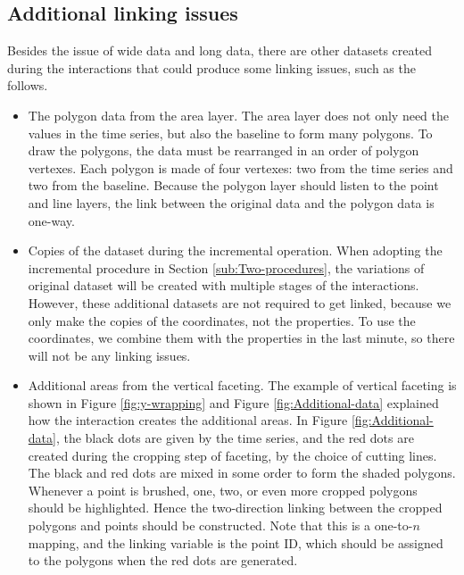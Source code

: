 \documentclass[12pt]{article}
\begin{document}
\subsection{Additional linking issues\label{sub:Linking-of-the-addition}}

Besides the issue of wide data and long data, there are other datasets
created during the interactions that could produce some linking issues,
such as the follows.
\begin{itemize} \itemsep 0in
\item The polygon data from the area layer.
The area layer does not
only need the values in the time series, but also the baseline to
form many polygons. To draw the polygons, the data must be rearranged
in an order of polygon vertexes. Each polygon is made of four vertexes:
two from the time series and two from the baseline. Because the polygon
layer should listen to the point and line layers, the link between
the original data and the polygon data is one-way.

\item Copies of the dataset during the incremental operation.
When adopting the incremental procedure in Section
\ref{sub:Two-procedures}, the variations of original dataset will
be created with multiple stages of the interactions. However, these
additional datasets are not required to get linked, because we only
make the copies of the coordinates, not the properties. To use the
coordinates, we combine them with the properties in the last minute,
so there will not be any linking issues.

\item Additional areas from the vertical faceting.
The example of vertical faceting is shown in Figure \ref{fig:y-wrapping}
and Figure \ref{fig:Additional-data} explained how the interaction
creates the additional areas. In Figure \ref{fig:Additional-data},
the black dots are given by the time series, and the red dots are
created during the cropping step of faceting, by the choice of
cutting lines. The black and red dots are mixed in some order to
form the shaded polygons. Whenever a point is brushed, one, two,
or even more cropped polygons should be highlighted. Hence the
two-direction linking between the cropped polygons and points
should be constructed. Note that this is a one-to-$n$ mapping,
and the linking variable is the point ID, which should be assigned
to the polygons when the red dots are generated.


\end{itemize}
\end{document}
